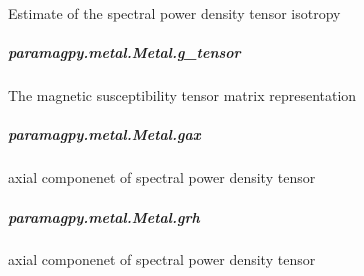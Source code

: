 \documentclass[a4paper,10pt,english,openany,oneside]{sphinxmanual}
\begin{document}
\begin{fulllineitems}
\begin{fulllineitems}
\begin{fulllineitems}
\label{\detokenize{reference/generated/paramagpy.metal.Metal.g_isotropy:paramagpy.metal.Metal.g_isotropy}}
Estimate of the spectral power density tensor isotropy

\end{fulllineitems}



\subparagraph{paramagpy.metal.Metal.g\_tensor}
\label{\detokenize{reference/generated/paramagpy.metal.Metal.g_tensor:paramagpy-metal-metal-g-tensor}}\label{\detokenize{reference/generated/paramagpy.metal.Metal.g_tensor::doc}}

\begin{fulllineitems}
\label{\detokenize{reference/generated/paramagpy.metal.Metal.g_tensor:paramagpy.metal.Metal.g_tensor}}
The magnetic susceptibility tensor matrix representation

\end{fulllineitems}



\subparagraph{paramagpy.metal.Metal.gax}
\label{\detokenize{reference/generated/paramagpy.metal.Metal.gax:paramagpy-metal-metal-gax}}\label{\detokenize{reference/generated/paramagpy.metal.Metal.gax::doc}}

\begin{fulllineitems}
\label{\detokenize{reference/generated/paramagpy.metal.Metal.gax:paramagpy.metal.Metal.gax}}
axial componenet of spectral power density tensor

\end{fulllineitems}



\subparagraph{paramagpy.metal.Metal.grh}
\label{\detokenize{reference/generated/paramagpy.metal.Metal.grh:paramagpy-metal-metal-grh}}\label{\detokenize{reference/generated/paramagpy.metal.Metal.grh::doc}}

\begin{fulllineitems}
\label{\detokenize{reference/generated/paramagpy.metal.Metal.grh:paramagpy.metal.Metal.grh}}
axial componenet of spectral power density tensor


\end{fulllineitems}
\end{fulllineitems}
\end{fulllineitems}
\end{document}
